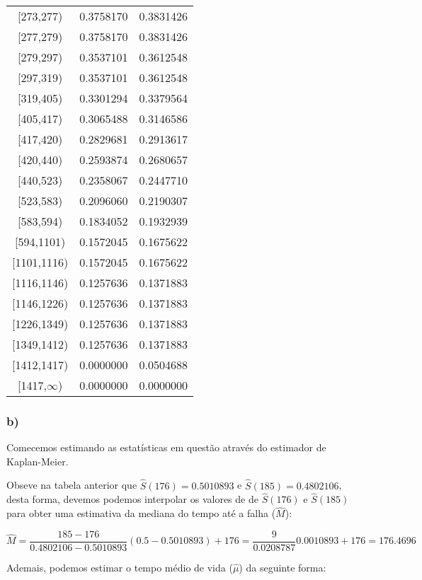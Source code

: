 \documentclass[
]{article}
\begin{document}
\begin{table}
\begin{tabular}[t]{ccc}
{}[273,277) & 0.3758170 & 0.3831426\\
\addlinespace
{}[277,279) & 0.3758170 & 0.3831426\\
{}[279,297) & 0.3537101 & 0.3612548\\
{}[297,319) & 0.3537101 & 0.3612548\\
{}[319,405) & 0.3301294 & 0.3379564\\
{}[405,417) & 0.3065488 & 0.3146586\\
\addlinespace
{}[417,420) & 0.2829681 & 0.2913617\\
{}[420,440) & 0.2593874 & 0.2680657\\
{}[440,523) & 0.2358067 & 0.2447710\\
{}[523,583) & 0.2096060 & 0.2190307\\
{}[583,594) & 0.1834052 & 0.1932939\\
\addlinespace
{}[594,1101) & 0.1572045 & 0.1675622\\
{}[1101,1116) & 0.1572045 & 0.1675622\\
{}[1116,1146) & 0.1257636 & 0.1371883\\
{}[1146,1226) & 0.1257636 & 0.1371883\\
{}[1226,1349) & 0.1257636 & 0.1371883\\
\addlinespace
{}[1349,1412) & 0.1257636 & 0.1371883\\
{}[1412,1417) & 0.0000000 & 0.0504688\\
{}[1417,$\infty$) & 0.0000000 & 0.0000000\\
\bottomrule
\end{tabular}
\end{table}

\hypertarget{b}{%
\subsubsection{b)}\label{b}}

Comecemos estimando as estatísticas em questão através do estimador de
Kaplan-Meier.

Obseve na tabela anterior que \(\widehat{S}(176)=0.5010893\) e
\(\widehat{S}(185)=0.4802106\), desta forma, devemos podemos interpolar
os valores de de \(\widehat{S}(176)\) e \(\widehat{S}(185)\) para obter
uma estimativa da mediana do tempo até a falha (\(\widehat{M}\)):

\[\widehat{M}=\frac{185-176}{0.4802106-0.5010893}(0.5-0.5010893)+176=\frac{9}{0.0208787}0.0010893+176=176.4696\]

Ademais, podemos estimar o tempo médio de vida (\(\widehat{\mu}\)) da
seguinte forma:
\end{document}
